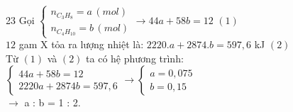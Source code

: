 \begin{loigiaibth}{23}
  Gọi $\begin {cases} n_{C_3H_8} = a \, (mol) \\ n_{C_4H_{10}} = b \, (mol) \end {cases} \longrightarrow 44a + 58b = 12 \,\, (1)$ \\ $12$ gam X tỏa ra lượng nhiệt là: $2220.a + 2874.b = 597{,}6$ kJ $(2)$ \\ Từ $(1)$ và $(2)$ ta có hệ phương trình: $\begin {cases} 44a + 58b = 12 \\ 2220a + 2874b = 597{,}6 \end {cases} \longrightarrow \begin {cases} a = 0{,}075 \\ b = 0{,}15 \end {cases}$ \\ $\rightarrow $ a : b = 1 : 2.
\end{loigiaibth}

